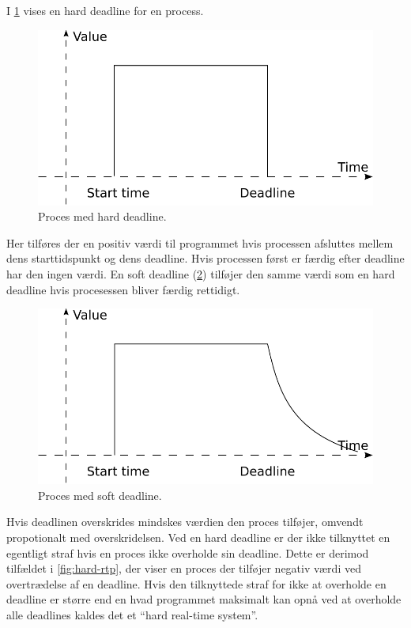 I \cref{fig:hard-dl} vises en hard deadline for en process. 
\begin{figure}
 \begin{center}
  \includegraphics[scale=0.75]{images/hard-deadline}
	\caption{Proces med hard deadline.}
	\label{fig:hard-dl}
\end{center}
\end{figure}
Her tilføres der en positiv værdi til programmet hvis processen afsluttes mellem dens starttidspunkt og dens deadline. Hvis processen først er færdig efter deadline har den ingen værdi. En soft deadline (\cref{figure:soft-dl}) tilføjer den samme værdi som en hard deadline hvis procesessen bliver færdig rettidigt. 
\begin{figure}
 \begin{center}
  \includegraphics[scale=0.75]{images/soft-deadline}
	\caption{Proces med soft deadline.}
	\label{figure:soft-dl}
\end{center}
\end{figure}
Hvis deadlinen overskrides mindskes værdien den proces tilføjer, omvendt propotionalt med overskridelsen. Ved en hard deadline er der ikke tilknyttet en egentligt straf hvis en proces ikke overholde sin deadline. Dette er derimod tilfældet i \cref{fig:hard-rtp}, der viser en proces der tilføjer negativ værdi ved overtrædelse af en deadline. Hvis den tilknyttede straf for ikke at overholde en deadline er større end en hvad programmet maksimalt kan opnå ved at overholde alle deadlines kaldes det et ``hard real-time system''\cite{Laprie1989}.
